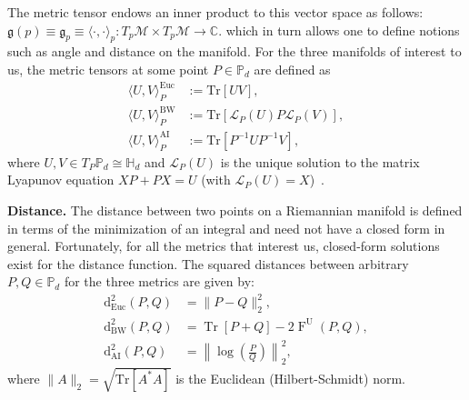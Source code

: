 \documentclass[12pt]{article}
\theoremstyle{definition}
\begin{document}
The metric tensor endows an inner product to this vector space as follows:
$\mathfrak{g} (p) \equiv \mathfrak{g}_p  \equiv \langle \cdot, \cdot \rangle _p: T_p \mathcal M \times T_p \mathcal M \to \mathbb C. $ which in turn allows one to define notions such as angle and distance on the manifold. For the three manifolds of interest to us, the metric tensors at some point $P \in \mathbb P_d$ are defined as
\begin{equation}
\begin{aligned}
    \langle U, V \rangle_P^\mathrm{Euc} &:= \mathrm{Tr}[U V], \\
    \langle U, V \rangle_P^\mathrm{BW} &:= \mathrm{Tr}\left[\mathcal L_P (U) P \mathcal L_P(V)\right], \\ 
    \langle U, V \rangle_P^\mathrm{AI} &:= \mathrm{Tr}\left[P ^{-1} U P ^{-1} V\right],
\end{aligned}
\end{equation}
where $U, V \in T_P \mathbb  P_d \cong \mathbb H_d$ and $\mathcal L_P (U) $ is the unique solution to the matrix Lyapunov equation $X P + P X = U$ (with $\mathcal  L_P (U) = X$)~\cite{Mishra2021Compare, Malago2018Wasserstein}. 

\textbf{Distance.} The distance between two points on a Riemannian manifold is defined in terms of the minimization of an integral and need not have a closed form in general. Fortunately, for all the metrics that interest us, closed-form solutions exist for the distance function. The squared distances between arbitrary $P, Q \in \mathbb P_d$ for the three metrics are given by:
\begin{equation}
\begin{aligned}
        \mathrm{d}_\mathrm{Euc}^2(P, Q) &= \|P-Q\|_2^2,  \\
        \mathrm{d}_\mathrm{BW}^2(P, Q) &= \operatorname{Tr}[P+Q] - 2 \operatorname{F}^\mathrm U(P,Q),  \\
        \mathrm{d}_\mathrm{AI}^2(P, Q) &= \left\|\operatorname{log}\left(\frac PQ \right) \right\|^2_2,
\end{aligned} 
\end{equation}
where $\|A\|_2 = \sqrt{\text{Tr}[A^*A]}$ is the Euclidean (Hilbert-Schmidt) norm. 
\end{document}
